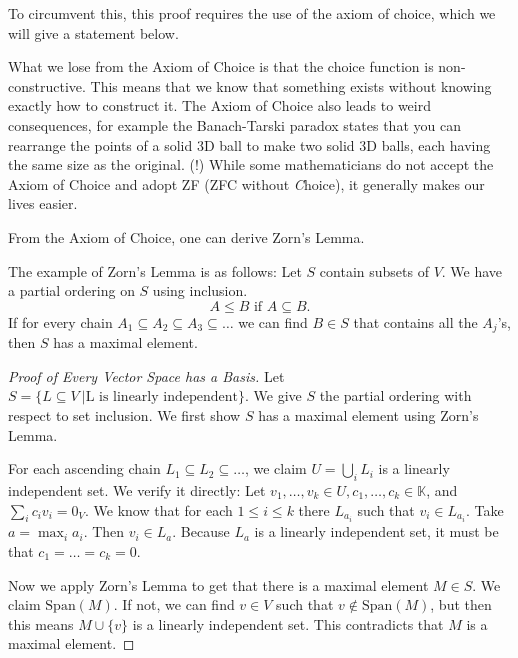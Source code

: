 To circumvent this, this proof requires the use of the axiom of choice, which we will give a statement below.
\begin{remark}
	What we lose from the Axiom of Choice is that the choice function is non-constructive. This means that we know that something exists without knowing
	exactly how to construct it. The Axiom of Choice also leads to weird consequences, for example the Banach-Tarski paradox states that you can
	rearrange the points of a solid 3D ball to make two solid 3D balls, each having the same size as the original. (!)
	While some mathematicians do not accept the Axiom of Choice and adopt ZF (ZFC without \textit{C}hoice), it generally makes our lives easier.
\end{remark}
From the Axiom of Choice, one can derive Zorn's Lemma.
\begin{remark}
	The example of Zorn's Lemma is as follows:
	Let $S$ contain subsets of $V$. We have a partial ordering on $S$ using inclusion.\[
	A\leq B \textrm{ if } A\subseteq B.
	\] 
	If for every chain $A_1\subseteq A_2 \subseteq A_3\subseteq\ldots$ we can find $B\in S$ that contains all the $A_j$'s, then $S$ has a maximal element.
\end{remark}
\begin{proof}[Proof of Every Vector Space has a Basis]
	Let $S = \{L\subseteq V \ | \textrm {L is linearly independent}\}$. We give $S$ the partial ordering with respect to set inclusion. We first show $S$ has a maximal element using Zorn's Lemma.

	For each ascending chain $L_1\subseteq L_2\subseteq \ldots$, we claim $U=\bigcup_i L_i$ is a linearly independent set.
	We verify it directly: Let $v_1,\ldots, v_k\in U, c_1,\ldots,c_k\in\mathbb{K}$,
	and $\sum_{i} c_i v_i = 0_{V}$.
	We know that for each $1\leq i\leq k$ there $L_{a_i}$ such that $v_i\in L_{a_i}$. Take $a=\max_i a_i$.
	Then $v_i\in L_a$. Because $L_a$ is a linearly independent set, it must be that $c_1=\ldots=c_k=0$.
	
	Now we apply Zorn's Lemma to get that there is a maximal element $M\in S$. We claim $\textrm{Span}(M)$.
	If not, we can find $v\in V$ such that $v\notin\textrm{Span}(M)$, but then this means $M\cup\{v\}$ is a linearly independent set.
	This contradicts that $M$ is a maximal element.
\end{proof}

